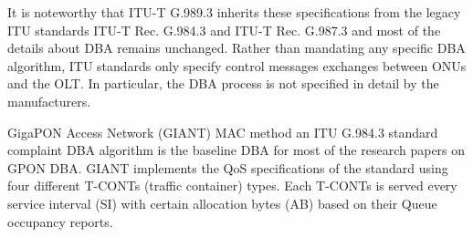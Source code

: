 It is noteworthy that ITU-T G.989.3 \cite{ITU_g.989.3_nodate} inherits these specifications from the legacy \ac{ITU} standards ITU-T Rec. G.984.3 \cite{itu984} and ITU-T Rec. G.987.3 \cite{itu987} and most of the details about \ac{DBA} remains unchanged. Rather than mandating any specific \ac{DBA} algorithm, \ac{ITU} standards only specify control messages exchanges between \ac{ONU}s and the OLT. In particular, the \ac{DBA} process is not specified in detail by the manufacturers\cite{7333289}.



GigaPON Access Network (GIANT) \ac{MAC} method \cite{DAC:DAC761,Angelopoulos2004,1267106} an \ac{ITU} G.984.3 \cite{itu984} standard complaint \ac{DBA} algorithm is the baseline \ac{DBA} for most of the research papers on \ac{GPON} \ac{DBA}. GIANT implements the \ac{QoS} specifications of the standard using four different \acp{T-CONT} (traffic container) types. Each \acp{T-CONT} is served every service interval (SI) with certain allocation bytes (AB) based on their Queue occupancy reports.

